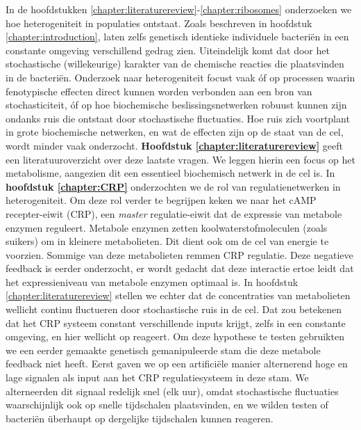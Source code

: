 In de hoofdstukken \ref{chapter:literaturereview}-\ref{chapter:ribosomes} onderzoeken we hoe heterogeniteit in populaties ontstaat.
%
Zoals beschreven in hoofdstuk \ref{chapter:introduction}, laten zelfs genetisch identieke individuele bacteriën in een constante omgeving verschillend gedrag zien.
%
Uiteindelijk komt dat door het stochastische (willekeurige) karakter van de chemische reacties die plaatsvinden in de bacteriën.
%
Onderzoek naar heterogeniteit focust vaak 
óf op processen waarin fenotypische effecten direct kunnen worden verbonden aan een bron van stochasticiteit,
óf op hoe biochemische beslissingsnetwerken robuust kunnen zijn ondanks ruis die ontstaat door stochastische fluctuaties.
%
Hoe ruis zich voortplant in grote biochemische netwerken, en wat de effecten zijn op de staat van de cel, wordt minder vaak onderzocht.
%
\textbf{Hoofdstuk \ref{chapter:literaturereview}} geeft een literatuuroverzicht over deze laatste vragen.
%
We leggen hierin een focus op het metabolisme, aangezien dit een essentieel biochemisch netwerk in de cel is.
%
In \textbf{hoofdstuk \ref{chapter:CRP}} onderzochten we de rol van regulatienetwerken in heterogeniteit.
%
Om deze rol verder te begrijpen keken we naar het 
cAMP recepter-eiwit (CRP), een \textit{master} regulatie-eiwit dat de expressie van metabole enzymen reguleert.
%
Metabole enzymen zetten koolwaterstofmoleculen (zoals suikers) om in kleinere metabolieten. 
Dit dient ook om de cel van energie te voorzien.
%
Sommige van deze metabolieten remmen CRP regulatie.
%
Deze negatieve feedback is eerder onderzocht, 
er wordt gedacht dat deze interactie ertoe leidt dat
het expressieniveau van metabole enzymen optimaal is.
%
In hoofdstuk \ref{chapter:literaturereview} stellen we echter dat de concentraties van metabolieten wellicht continu fluctueren door stochastische ruis in de cel.
%
Dat zou betekenen dat het CRP systeem constant verschillende inputs krijgt, 
zelfs in een constante omgeving, 
en hier wellicht op reageert.
%
Om deze hypothese te testen gebruikten we een eerder gemaakte
genetisch gemanipuleerde \ecoli stam die deze metabole feedback niet heeft.
%
Eerst gaven we op een artificiële manier alternerend hoge en lage signalen als input aan het CRP regulatiesysteem in deze stam.
%
We alterneerden dit signaal redelijk snel (elk uur), 
omdat stochastische fluctuaties waarschijnlijk ook op snelle tijdschalen plaatsvinden,
en we wilden testen of bacteriën überhaupt op dergelijke tijdschalen kunnen reageren.
